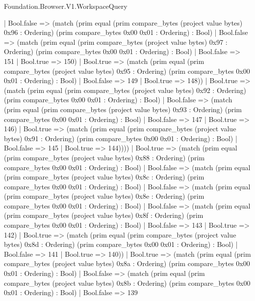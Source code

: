 \begin{lexlean}{Foundation.Browser.V1.WorkspaceQuery}
\begin{semanticmodule}
{                | Bool.false => (match (prim equal (prim compare_bytes (project value bytes) 0x96 : Ordering) (prim compare_bytes 0x00 0x01 : Ordering) : Bool)
                  | Bool.false => (match (prim equal (prim compare_bytes (project value bytes) 0x97 : Ordering) (prim compare_bytes 0x00 0x01 : Ordering) : Bool)
                    | Bool.false => 151
                    | Bool.true => 150)
                  | Bool.true => (match (prim equal (prim compare_bytes (project value bytes) 0x95 : Ordering) (prim compare_bytes 0x00 0x01 : Ordering) : Bool)
                    | Bool.false => 149
                    | Bool.true => 148))
                | Bool.true => (match (prim equal (prim compare_bytes (project value bytes) 0x92 : Ordering) (prim compare_bytes 0x00 0x01 : Ordering) : Bool)
                  | Bool.false => (match (prim equal (prim compare_bytes (project value bytes) 0x93 : Ordering) (prim compare_bytes 0x00 0x01 : Ordering) : Bool)
                    | Bool.false => 147
                    | Bool.true => 146)
                  | Bool.true => (match (prim equal (prim compare_bytes (project value bytes) 0x91 : Ordering) (prim compare_bytes 0x00 0x01 : Ordering) : Bool)
                    | Bool.false => 145
                    | Bool.true => 144))))
            | Bool.true => (match (prim equal (prim compare_bytes (project value bytes) 0x88 : Ordering) (prim compare_bytes 0x00 0x01 : Ordering) : Bool)
              | Bool.false => (match (prim equal (prim compare_bytes (project value bytes) 0x8c : Ordering) (prim compare_bytes 0x00 0x01 : Ordering) : Bool)
                | Bool.false => (match (prim equal (prim compare_bytes (project value bytes) 0x8e : Ordering) (prim compare_bytes 0x00 0x01 : Ordering) : Bool)
                  | Bool.false => (match (prim equal (prim compare_bytes (project value bytes) 0x8f : Ordering) (prim compare_bytes 0x00 0x01 : Ordering) : Bool)
                    | Bool.false => 143
                    | Bool.true => 142)
                  | Bool.true => (match (prim equal (prim compare_bytes (project value bytes) 0x8d : Ordering) (prim compare_bytes 0x00 0x01 : Ordering) : Bool)
                    | Bool.false => 141
                    | Bool.true => 140))
                | Bool.true => (match (prim equal (prim compare_bytes (project value bytes) 0x8a : Ordering) (prim compare_bytes 0x00 0x01 : Ordering) : Bool)
                  | Bool.false => (match (prim equal (prim compare_bytes (project value bytes) 0x8b : Ordering) (prim compare_bytes 0x00 0x01 : Ordering) : Bool)
                    | Bool.false => 139
}
\end{semanticmodule}
\end{lexlean}
